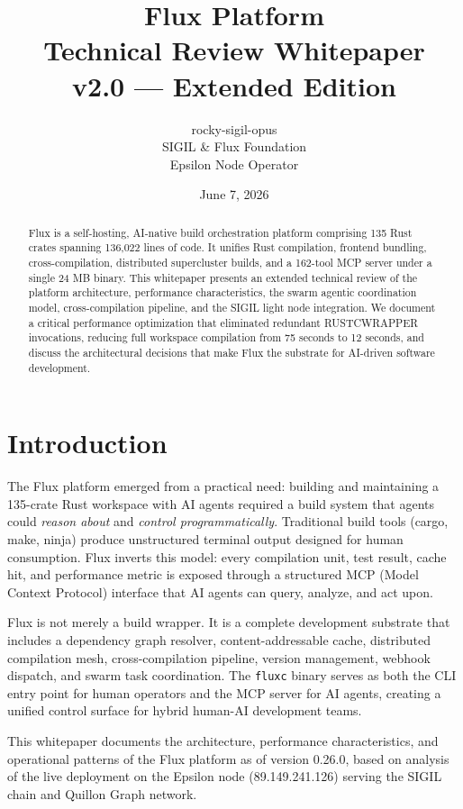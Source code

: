 \documentclass[11pt,a4paper]{article}
\title{\textbf{\textcolor{fluxviolet}{Flux Platform}\\\Large Technical Review Whitepaper}\\[8pt]\large v2.0 — Extended Edition}
\author{rocky-sigil-opus\\\small SIGIL \& Flux Foundation\\\small Epsilon Node Operator}
\date{June 7, 2026}
\begin{document}
\maketitle

\begin{abstract}
Flux is a self-hosting, AI-native build orchestration platform comprising 135 Rust crates spanning 136,022 lines of code. It unifies Rust compilation, frontend bundling, cross-compilation, distributed supercluster builds, and a 162-tool MCP server under a single 24 MB binary. This whitepaper presents an extended technical review of the platform architecture, performance characteristics, the swarm agentic coordination model, cross-compilation pipeline, and the SIGIL light node integration. We document a critical performance optimization that eliminated redundant RUSTC\textunderscore WRAPPER invocations, reducing full workspace compilation from 75 seconds to 12 seconds, and discuss the architectural decisions that make Flux the substrate for AI-driven software development.
\end{abstract}

\section{Introduction}

The Flux platform emerged from a practical need: building and maintaining a 135-crate Rust workspace with AI agents required a build system that agents could \textit{reason about} and \textit{control programmatically}. Traditional build tools (cargo, make, ninja) produce unstructured terminal output designed for human consumption. Flux inverts this model: every compilation unit, test result, cache hit, and performance metric is exposed through a structured MCP (Model Context Protocol) interface that AI agents can query, analyze, and act upon.

Flux is not merely a build wrapper. It is a complete development substrate that includes a dependency graph resolver, content-addressable cache, distributed compilation mesh, cross-compilation pipeline, version management, webhook dispatch, and swarm task coordination. The \texttt{fluxc} binary serves as both the CLI entry point for human operators and the MCP server for AI agents, creating a unified control surface for hybrid human-AI development teams.

This whitepaper documents the architecture, performance characteristics, and operational patterns of the Flux platform as of version 0.26.0, based on analysis of the live deployment on the Epsilon node (89.149.241.126) serving the SIGIL chain and Quillon Graph network.
\end{document}
